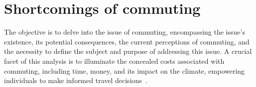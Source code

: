 \section{Shortcomings of commuting}\label{sec:shortcomings-of-commuting}

The objective is to delve into the issue of commuting, encompassing the issue's existence, its potential consequences,
the current perceptions of commuting, and the necessity to define the subject and purpose of addressing this issue.
A crucial facet of this analysis is to illuminate the concealed costs associated with commuting, including time, money,
and its impact on the climate, empowering individuals to make informed travel decisions~\cite{alma9921355859805762}.

